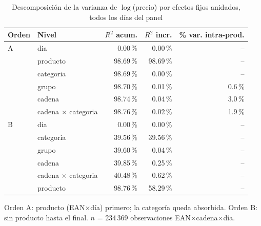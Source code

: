 \begin{table}[htbp]
\caption{Descomposici\'on de la varianza de $\log$(precio) por efectos fijos anidados, todos los d\'ias del panel}
\label{tab:varianza}
\centering\scriptsize\setlength{\tabcolsep}{3pt}
\begin{tabular}{@{}llrrr@{}}
\toprule
Orden & Nivel & $R^2$ acum. & $R^2$ incr. & \% var. intra-prod. \\
\midrule
A & dia & 0.00\,\% & 0.00\,\% & -- \\
 & producto & 98.69\,\% & 98.69\,\% & -- \\
 & categoria & 98.69\,\% & 0.00\,\% & -- \\
 & grupo & 98.70\,\% & 0.01\,\% & 0.6\,\% \\
 & cadena & 98.74\,\% & 0.04\,\% & 3.0\,\% \\
 & cadena $\times$ categoria & 98.76\,\% & 0.02\,\% & 1.9\,\% \\
\midrule
B & dia & 0.00\,\% & 0.00\,\% & -- \\
 & categoria & 39.56\,\% & 39.56\,\% & -- \\
 & grupo & 39.60\,\% & 0.04\,\% & -- \\
 & cadena & 39.85\,\% & 0.25\,\% & -- \\
 & cadena $\times$ categoria & 40.48\,\% & 0.62\,\% & -- \\
 & producto & 98.76\,\% & 58.29\,\% & -- \\
\bottomrule\end{tabular}
\par\smallskip\raggedright\scriptsize Orden A: producto (EAN$\times$d\'ia) primero; la categor\'ia queda absorbida. Orden B: sin producto hasta el final. $n$ = 234\,369 observaciones EAN$\times$cadena$\times$d\'ia.
\end{table}
